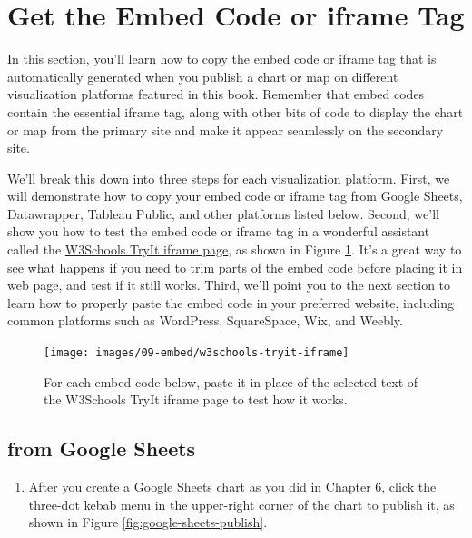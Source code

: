 \documentclass[
  english,
]{book}
\providecommand{\tightlist}{%
  \setlength{\itemsep}{0pt}\setlength{\parskip}{0pt}}
\begin{document}
\hypertarget{embed-code}{%
\section*{Get the Embed Code or iframe Tag}\label{embed-code}}

In this section, you'll learn how to copy the embed code or iframe tag that is automatically generated when you publish a chart or map on different visualization platforms featured in this book. Remember that embed codes contain the essential iframe tag, along with other bits of code to display the chart or map from the primary site and make it appear seamlessly on the secondary site.

We'll break this down into three steps for each visualization platform. First, we will demonstrate how to copy your embed code or iframe tag from Google Sheets, Datawrapper, Tableau Public, and other platforms listed below. Second, we'll show you how to test the embed code or iframe tag in a wonderful assistant called the \href{https://www.w3schools.com/tags/tryit.asp?filename=tryhtml_iframe}{W3Schools TryIt iframe page}, as shown in Figure \ref{fig:w3schools-tryit-iframe}. It's a great way to see what happens if you need to trim parts of the embed code before placing it in web page, and test if it still works. Third, we'll point you to the next section to learn how to properly paste the embed code in your preferred website, including common platforms such as WordPress, SquareSpace, Wix, and Weebly.



\begin{figure}
\texttt{[image: images/09-embed/w3schools-tryit-iframe]} \caption{For each embed code below, paste it in place of the selected text of the W3Schools TryIt iframe page to test how it works.}\label{fig:w3schools-tryit-iframe}
\end{figure}

\hypertarget{from-google-sheets}{%
\subsection*{from Google Sheets}\label{from-google-sheets}}

\begin{enumerate}
\def\labelenumi{\arabic{enumi}.}
\tightlist
\item
  After you create a \href{chart-google.html}{Google Sheets chart as you did in Chapter 6}, click the three-dot kebab menu in the upper-right corner of the chart to publish it, as shown in Figure \ref{fig:google-sheets-publish}.
\end{enumerate}
\end{document}
